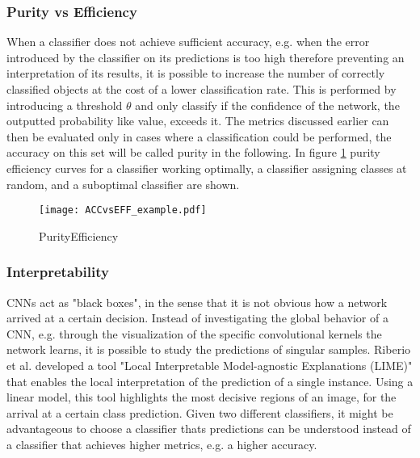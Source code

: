 \subsubsection{Purity vs Efficiency}
When a classifier does not achieve sufficient accuracy, e.g. when the error introduced by the classifier on its predictions is too high therefore preventing an interpretation of its results, it is possible to increase the number of correctly classified objects at the cost of a lower classification rate. This is performed by introducing a threshold $\theta$ and only classify if the confidence of the network, the outputted probability like value, exceeds it. The metrics discussed earlier can then be evaluated only in cases where a classification could be performed, the accuracy on this set will be called purity in the following. In figure \ref{fig:PURvsEFF} purity efficiency curves for a classifier working optimally, a classifier assigning classes at random, and a suboptimal classifier are shown. 

\begin{figure}[H]
\begin{center}
\texttt{[image: ACCvsEFF\_example.pdf]}

\end{center}
\caption{PurityEfficiency}
\label{fig:PURvsEFF}
\end{figure}

\subsubsection{Interpretability}
CNNs act as "black boxes", in the sense that it is not obvious how a network arrived at a certain decision. Instead of investigating the global behavior of a CNN, e.g. through the visualization of the specific convolutional kernels the network learns, it is possible to study the predictions of singular samples. Riberio et al. developed a tool "Local Interpretable Model-agnostic Explanations (LIME)" \cite{Ribeiro2016} that enables the local interpretation of the prediction of a single instance. Using a linear model, this tool highlights the most decisive regions of an image, for the arrival at a certain class prediction. Given two different classifiers, it might be advantageous to choose a classifier thats predictions can be understood instead of a classifier that achieves higher metrics, e.g. a higher accuracy. 


